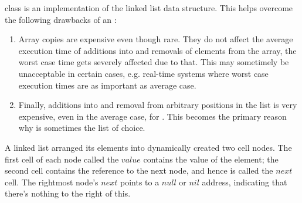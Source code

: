 \documentclass[12pt,a4paper]{article}
\begin{document}
\lstinline@LinkedList@ class is an implementation of the linked list data structure. This helps overcome the following drawbacks of an \lstinline@ArrayList@: 
\begin{enumerate}
	\item Array copies are expensive even though rare. They do not affect the average execution time of additions into and removals of elements from the array, the worst case time gets severely affected due to that. This may sometimely be unacceptable in certain cases, e.g. real-time systems where worst case execution times are as important as average case.
	\item Finally, additions into and removal from arbitrary positions in the list is very expensive, even in the average case, for \lstinline@ArrayList@s. This becomes the primary reason why \lstinline@LinkedList@ is sometimes the list of choice.	
\end{enumerate}

A linked list arranged its elements into dynamically created two cell nodes. The first cell of each node called the $value$ contains the value of the element; the second cell contains the reference to the next node, and hence is called the $next$ cell. The rightmost node's $next$ points to a $null$ or $nil$ address, indicating that there's nothing to the right of this.
\end{document}
